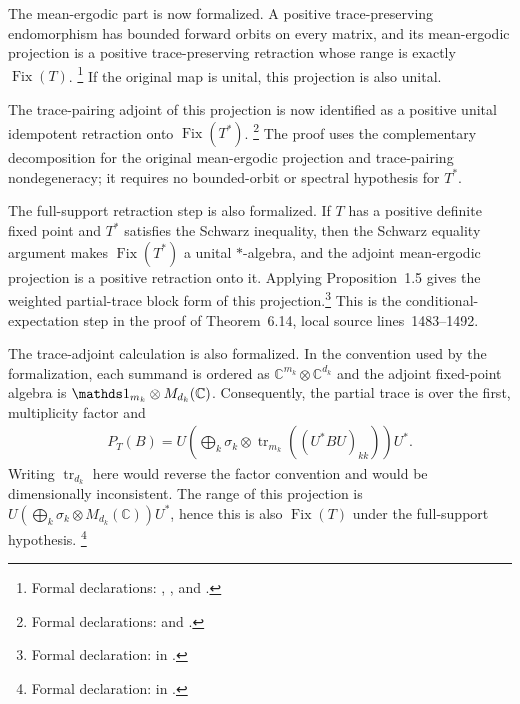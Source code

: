 \documentclass{article}
\begin{document}
The mean-ergodic part is now formalized.  A positive trace-preserving
endomorphism has bounded forward orbits on every matrix, and its
mean-ergodic projection is a positive trace-preserving retraction whose range
is exactly $\operatorname{Fix}(T)$.
\footnote{Formal declarations:
,
, and
.}
If the original map is unital, this projection is also unital.

The trace-pairing adjoint of this projection is now identified as a positive
unital idempotent retraction onto $\operatorname{Fix}(T^*)$.
\footnote{Formal declarations:
and
.}
The proof uses the complementary decomposition for the original
mean-ergodic projection and trace-pairing nondegeneracy; it requires no
bounded-orbit or spectral hypothesis for $T^*$.

The full-support retraction step is also formalized.  If $T$ has a positive
definite fixed point and $T^*$ satisfies the Schwarz inequality, then the
Schwarz equality argument makes $\operatorname{Fix}(T^*)$ a unital
$*$-algebra, and the adjoint mean-ergodic projection is a positive retraction
onto it.  Applying Proposition~1.5 gives the weighted partial-trace block
form of this projection.\footnote{Formal declaration:
in
.}
This is the conditional-expectation step in the proof of Theorem~6.14,
local source lines~1483--1492.

The trace-adjoint calculation is also formalized.  In the convention used by
the formalization, each summand is ordered as
$\mathbb C^{m_k}\otimes\mathbb C^{d_k}$ and the adjoint fixed-point algebra is
$\Id_{m_k}\otimes M_{d_k}(\mathbb C)$.  Consequently, the partial trace is
over the first, multiplicity factor and
\begin{align}
  P_T(B)
    =U\left(\bigoplus_k \sigma_k\otimes
      \operatorname{tr}_{m_k}((U^*BU)_{kk})\right)U^*.
\end{align}
Writing $\operatorname{tr}_{d_k}$ here would reverse the factor convention
and would be dimensionally inconsistent.  The range of this projection is
$U(\bigoplus_k\sigma_k\otimes M_{d_k}(\mathbb C))U^*$, hence this is also
$\operatorname{Fix}(T)$ under the full-support hypothesis.
\footnote{Formal declaration:
in
.}
\end{document}
